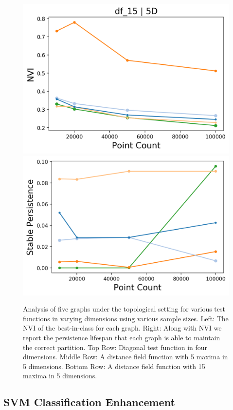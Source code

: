 \begin{figure}[htbp]
    \includegraphics[width=0.48\linewidth]{figs/chap7/df_15_5D_nvi.png}
    \includegraphics[width=0.48\linewidth]{figs/chap7/df_15_5D.png}
    \caption[Analysis of graphs for topological stability]{Analysis of five graphs under the topological setting for various test functions in varying dimensions using various sample sizes.
    Left: The NVI of the best-in-class for each graph.
    Right: Along with NVI we report the persistence lifespan that each graph is able to maintain the correct partition.
    Top Row: Diagonal test function in four dimensions.
    Middle Row: A distance field function with 5 maxima in 5 dimensions.
    Bottom Row: A distance field function with 15 maxima in 5 dimensions.}
    \label{fig:graph_topo}
\end{figure}

\subsection{SVM Classification Enhancement}

